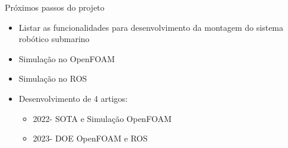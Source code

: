 \begin{frame}[t]{Próximos passos do projeto}
    \begin{itemize}
        \item Listar as funcionalidades para desenvolvimento da montagem do sistema robótico submarino
        \item Simulação no OpenFOAM
        \item Simulação no ROS
        \item Desenvolvimento de 4 artigos: 
        \begin{itemize}
            \item[] 2022- SOTA e Simulação OpenFOAM
            \item[] 2023- DOE OpenFOAM e ROS 
        \end{itemize}   
        
    \end{itemize}    
\end{frame}


